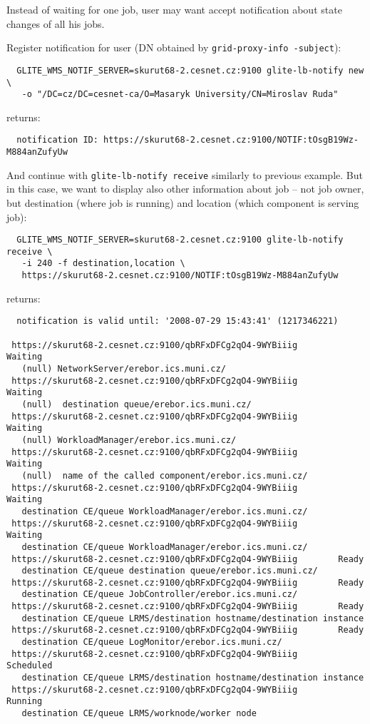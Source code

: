 Instead of waiting for one job, user may want accept notification about 
state changes of all his jobs.

Register notification for user (DN obtained by \verb'grid-proxy-info -subject'):
\begin{verbatim}
  GLITE_WMS_NOTIF_SERVER=skurut68-2.cesnet.cz:9100 glite-lb-notify new \
   -o "/DC=cz/DC=cesnet-ca/O=Masaryk University/CN=Miroslav Ruda"
\end{verbatim}

returns:

\begin{verbatim}
  notification ID: https://skurut68-2.cesnet.cz:9100/NOTIF:tOsgB19Wz-M884anZufyUw 
\end{verbatim}

And continue with \verb'glite-lb-notify receive' similarly to previous example.
But in this case, we want to display also other information about job --
not job owner, but destination (where job is running) and location (which component is 
serving job):

\begin{verbatim}
  GLITE_WMS_NOTIF_SERVER=skurut68-2.cesnet.cz:9100 glite-lb-notify receive \
   -i 240 -f destination,location \
   https://skurut68-2.cesnet.cz:9100/NOTIF:tOsgB19Wz-M884anZufyUw
\end{verbatim}

returns:

\begin{verbatim}
  notification is valid until: '2008-07-29 15:43:41' (1217346221)

 https://skurut68-2.cesnet.cz:9100/qbRFxDFCg2qO4-9WYBiiig        Waiting
   (null) NetworkServer/erebor.ics.muni.cz/
 https://skurut68-2.cesnet.cz:9100/qbRFxDFCg2qO4-9WYBiiig        Waiting
   (null)  destination queue/erebor.ics.muni.cz/
 https://skurut68-2.cesnet.cz:9100/qbRFxDFCg2qO4-9WYBiiig        Waiting
   (null) WorkloadManager/erebor.ics.muni.cz/
 https://skurut68-2.cesnet.cz:9100/qbRFxDFCg2qO4-9WYBiiig        Waiting
   (null)  name of the called component/erebor.ics.muni.cz/
 https://skurut68-2.cesnet.cz:9100/qbRFxDFCg2qO4-9WYBiiig        Waiting
   destination CE/queue WorkloadManager/erebor.ics.muni.cz/
 https://skurut68-2.cesnet.cz:9100/qbRFxDFCg2qO4-9WYBiiig        Waiting
   destination CE/queue WorkloadManager/erebor.ics.muni.cz/
 https://skurut68-2.cesnet.cz:9100/qbRFxDFCg2qO4-9WYBiiig        Ready
   destination CE/queue destination queue/erebor.ics.muni.cz/
 https://skurut68-2.cesnet.cz:9100/qbRFxDFCg2qO4-9WYBiiig        Ready
   destination CE/queue JobController/erebor.ics.muni.cz/
 https://skurut68-2.cesnet.cz:9100/qbRFxDFCg2qO4-9WYBiiig        Ready
   destination CE/queue LRMS/destination hostname/destination instance
 https://skurut68-2.cesnet.cz:9100/qbRFxDFCg2qO4-9WYBiiig        Ready
   destination CE/queue LogMonitor/erebor.ics.muni.cz/
 https://skurut68-2.cesnet.cz:9100/qbRFxDFCg2qO4-9WYBiiig        Scheduled
   destination CE/queue LRMS/destination hostname/destination instance
 https://skurut68-2.cesnet.cz:9100/qbRFxDFCg2qO4-9WYBiiig        Running
   destination CE/queue LRMS/worknode/worker node

\end{verbatim}


